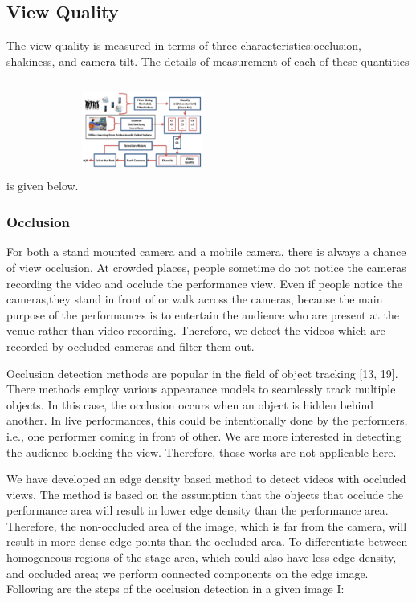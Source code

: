 \documentclass{sig-alternate}
\begin{document}
\subsection{View Quality}
The view quality is measured in terms of three characteristics:occlusion, shakiness, and camera tilt. The details of measurement
of each of these quantities is given below.
\includegraphics[width=4cm, height=4cm]{img2.png}
\subsubsection{Occlusion}
For both a stand mounted camera and a mobile camera, there is always a chance of view occlusion. At crowded places, people sometime do not notice the cameras recording the video and occlude the performance view. Even if people notice the cameras,they stand in front of or walk across the cameras, because the main purpose of the performances is to entertain the audience who are present at the venue rather than video recording. Therefore, we detect the videos which are recorded by occluded cameras and filter them out.

Occlusion detection methods are popular in the field of object tracking [13, 19]. There methods employ various appearance models to seamlessly track multiple objects. In this case, the occlusion occurs when an object is hidden behind another. In live performances, this could be intentionally done by the performers, i.e., one performer coming in front of other. We are more interested in detecting the audience blocking the view. Therefore, those works are not applicable here.

We have developed an edge density based method to detect videos with occluded views. The method is based on the assumption that the objects that occlude the performance area will result in lower edge density than the performance area. Therefore, the non-occluded area of the image, which is far from the camera, will result in more dense edge points than the occluded area. To differentiate between homogeneous regions of the stage area, which could also have less edge density, and occluded area; we perform connected components on the edge image. Following are the steps of the occlusion detection in a given image I:
\end{document}
